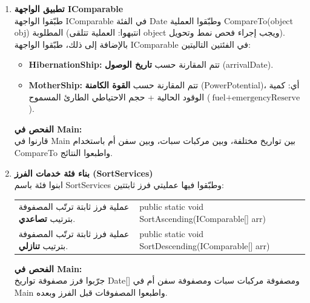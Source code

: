\documentclass[14pt]{extarticle}
\begin{document}
\begin{enumerate}[resume, label=\textbf{تمرين \arabic*:}, wide=0pt, leftmargin=*, itemsep=2.2em]
    \item \textbf{تطبيق الواجهة \textenglish{IComparable}} \\
    طبّقوا الواجهة \textenglish{IComparable} في الفئة \textenglish{Date} وطبّقوا العملية \textenglish{CompareTo(object obj)} المطلوبة (انتبهوا: العملية تتلقى \textenglish{object} ويجب إجراء فحص نمط وتحويل). \\
    بالإضافة إلى ذلك، طبّقوا الواجهة \textenglish{IComparable} في الفئتين التاليتين:
    \begin{itemize}
        \item \textbf{\textenglish{HibernationShip}:} تتم المقارنة حسب \textbf{تاريخ الوصول} (\textenglish{arrivalDate}).
        \item \textbf{\textenglish{MotherShip}:} تتم المقارنة حسب \textbf{القوة الكامنة} (\textenglish{PowerPotential})، أي: كمية الوقود الحالية + حجم الاحتياطي الطارئ المسموح ($\text{fuel} + \text{emergencyReserve}$).
    \end{itemize}
    \textbf{الفحص في \textenglish{Main}:} \\
    قارنوا في \textenglish{Main} بين تواريخ مختلفة، وبين مركبات سبات، وبين سفن أم باستخدام \textenglish{CompareTo} واطبعوا النتائج.

    \item \textbf{بناء فئة خدمات الفرز (\textenglish{SortServices})} \\
    ابنوا فئة باسم \textenglish{SortServices} وطبّقوا فيها عمليتي فرز ثابتتين:

    {\centering
    \renewcommand{\arraystretch}{1.2}
    \small
    \begin{tabular}{|>{\raggedleft\arraybackslash}p{}|>{\raggedright\arraybackslash}p{}|}
    \hline
    \multicolumn{2}{|c|}{\textbf{الفئة: \textenglish{SortServices}}} \\
    \hline
    عملية فرز ثابتة ترتّب المصفوفة بترتيب \textbf{تصاعدي}. & \textenglish{public static void SortAscending(IComparable[] arr)} \\
    \hline
    عملية فرز ثابتة ترتّب المصفوفة بترتيب \textbf{تنازلي}. & \textenglish{public static void SortDescending(IComparable[] arr)} \\
    \hline
    \end{tabular}
    \par} %

    \vspace{2em}
    \noindent \textbf{الفحص في \textenglish{Main}:} \\
    جرّبوا فرز مصفوفة تواريخ \textenglish{Date[]} ومصفوفة مركبات سبات ومصفوفة سفن أم في \textenglish{Main} واطبعوا المصفوفات قبل الفرز وبعده.


\end{enumerate}
\end{document}
